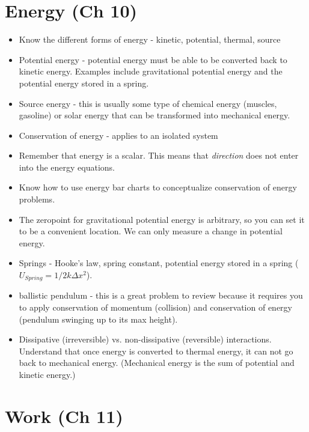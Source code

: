 \section{Energy (Ch 10)}
\vspace*{-.15in}
\begin{itemize}
\item Know the different forms of energy - kinetic, potential,
  thermal, source
\item Potential energy - potential energy must be able to be converted
  back to kinetic energy.  Examples include gravitational potential
  energy and the potential energy stored in a spring.
\item Source energy - this is usually some type of chemical energy
  (muscles, gasoline) or solar energy that can be transformed into
  mechanical energy.
\item Conservation of energy - applies to an isolated system
\item Remember that energy is a scalar.  This means that {\em
    direction} does not enter into the energy equations.
\item Know how to use energy bar charts to conceptualize conservation
  of energy problems.
\item The zeropoint for gravitational potential energy is arbitrary,
  so you can set it to be a convenient location.  We can
  only measure a change in potential energy.
\item Springs - Hooke's law, spring constant, potential energy stored in a
  spring ($U_{Spring} = 1/2 k \Delta x^2$).
\item ballistic pendulum - this is a great problem to review because it
  requires you to apply conservation of momentum (collision) and
  conservation of energy (pendulum swinging up to its max height).
\item Dissipative (irreversible) vs. non-dissipative (reversible) interactions.  Understand that
  once energy is converted to thermal energy, it can not go back to
  mechanical energy. (Mechanical energy is the sum of potential and
  kinetic energy.) 
\end{itemize}

 
\vspace*{-.15in}
\section{Work (Ch 11)}
\vspace*{-.15in}

